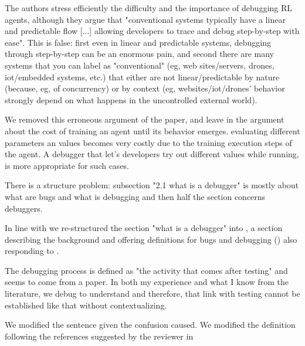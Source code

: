 \begin{remark} 
The authors stress efficiently the difficulty and the importance of debugging RL agents, although they argue that "conventional systems typically have a linear and predictable flow [...] allowing developers to trace and debug step-by-step with ease". This is false: first even in linear and predictable systems, debugging through step-by-step can be an enormous pain, and second there are many systems that you can label as "conventional" (eg, web sites/servers, drones, iot/embedded systems, etc.) that either are not linear/predictable by nature (because, eg, of concurrency) or by context (eg, websites/iot/drones' behavior strongly depend on what happens in the uncontrolled external world).
\end{remark}
\begin{solved}
We removed this erroneous argument of the paper, and leave in the argument about the cost of training an agent until its behavior emerges. evaluating different parameters an values becomes very costly  due to the training execution steps of the agent. A debugger that let's developers try out different values while running, is more appropriate for such cases.
\end{solved}

\begin{remark}\label{rem:debuggers}
There is a structure problem: subsection "2.1 what is a debugger" is mostly about what are bugs and what is debugging and then half the section concerns debuggers.
\end{remark}
\begin{solved}
In line with  we re-structured the section "what is a debugger" into , a section describing the background and offering definitions for bugs and debugging () also responding to .
\end{solved}

\begin{remark}
The debugging process is defined as "the activity that comes after testing" and seems to come from a paper. In both my experience and what I know from the literature, we debug to understand and therefore, that link with testing cannot be established like that without contextualizing.
\end{remark}
\begin{solved}
We modified the sentence given the confusion caused. We modified the definition following the references suggested by the reviewer in 
\end{solved}

